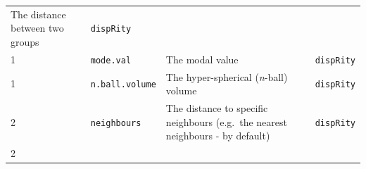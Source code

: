 \documentclass[]{book}
\begin{document}
\begin{longtable}[]{@{}llll@{}}
\begin{minipage}[t]{0.64\columnwidth}
The distance between two groups\strut
\end{minipage} & \begin{minipage}[t]{0.10\columnwidth}\raggedright
\texttt{dispRity}\strut
\end{minipage}\tabularnewline
\begin{minipage}[t]{0.07\columnwidth}\raggedright
1\strut
\end{minipage} & \begin{minipage}[t]{0.07\columnwidth}\raggedright
\texttt{mode.val}\strut
\end{minipage} & \begin{minipage}[t]{0.64\columnwidth}\raggedright
The modal value\strut
\end{minipage} & \begin{minipage}[t]{0.10\columnwidth}\raggedright
\texttt{dispRity}\strut
\end{minipage}\tabularnewline
\begin{minipage}[t]{0.07\columnwidth}\raggedright
1\strut
\end{minipage} & \begin{minipage}[t]{0.07\columnwidth}\raggedright
\texttt{n.ball.volume}\strut
\end{minipage} & \begin{minipage}[t]{0.64\columnwidth}\raggedright
The hyper-spherical (\emph{n}-ball) volume\strut
\end{minipage} & \begin{minipage}[t]{0.10\columnwidth}\raggedright
\texttt{dispRity}\strut
\end{minipage}\tabularnewline
\begin{minipage}[t]{0.07\columnwidth}\raggedright
2\strut
\end{minipage} & \begin{minipage}[t]{0.07\columnwidth}\raggedright
\texttt{neighbours}\strut
\end{minipage} & \begin{minipage}[t]{0.64\columnwidth}\raggedright
The distance to specific neighbours (e.g.~the nearest neighbours - by default)\strut
\end{minipage} & \begin{minipage}[t]{0.10\columnwidth}\raggedright
\texttt{dispRity}\strut
\end{minipage}\tabularnewline
\begin{minipage}[t]{0.07\columnwidth}\raggedright
2\strut
\end{minipage} & \begin{minipage}[t]{0.07\columnwidth}\raggedright

\end{minipage}
\end{longtable}
\end{document}
